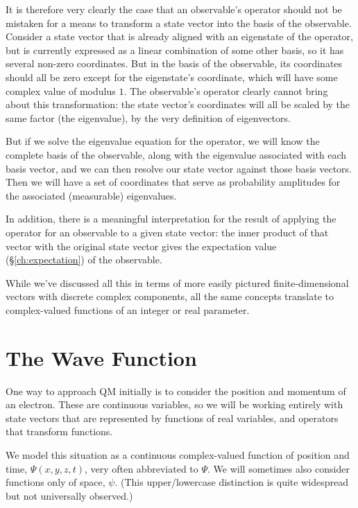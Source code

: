 It is therefore very clearly the case that an observable's operator should not be mistaken for a means to transform a state vector into the basis of the observable. Consider a state vector that is already aligned with an eigenstate of the operator, but is currently expressed as a linear combination of some other basis, so it has several non-zero coordinates. But in the basis of the observable, its coordinates should all be zero except for the eigenstate's coordinate, which will have some complex value of modulus $1$. The observable's operator clearly cannot bring about this transformation: the state vector's coordinates will all be scaled by the same factor (the eigenvalue), by the very definition of eigenvectors.

But if we solve the eigenvalue equation for the operator, we will know the complete basis of the observable, along with the eigenvalue associated with each basis vector, and we can then resolve our state vector against those basis vectors. Then we will have a set of coordinates that serve as probability amplitudes for the associated (measurable) eigenvalues.

In addition, there is a meaningful interpretation for the result of applying the operator for an observable to a given state vector: the inner product of that vector with the original state vector gives the expectation value (§\ref{ch:expectation}) of the observable.

While we've discussed all this in terms of more easily pictured finite-dimensional vectors with discrete complex components, all the same concepts translate to complex-valued functions of an integer or real parameter.

\section{The Wave Function}

One way to approach QM initially is to consider the position and momentum of an electron. These are continuous variables, so we will be working entirely with state vectors that are represented by functions of real variables, and operators that transform functions.

We model this situation as a continuous complex-valued function of position and time, $\Psi(x, y, z, t)$, very often abbreviated to $\Psi$. We will sometimes also consider functions only of space, $\psi$. (This upper/lowercase distinction is quite widespread but not universally observed.)

